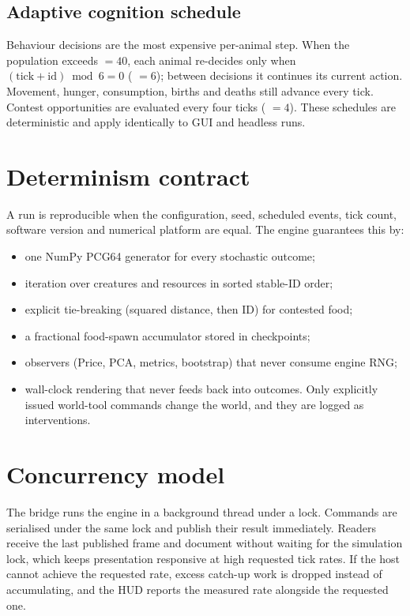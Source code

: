 \subsection{Adaptive cognition schedule}
Behaviour decisions are the most expensive per-animal step. When the population
exceeds  $=40$, each animal re-decides only
when $(\text{tick}+\text{id}) \bmod 6 = 0$ (
$=6$); between decisions it continues its current action. Movement, hunger,
consumption, births and deaths still advance every tick. Contest opportunities are
evaluated every four ticks ( $=4$). These
schedules are deterministic and apply identically to GUI and headless runs.

\section{Determinism contract}
A run is reproducible when the configuration, seed, scheduled events, tick count,
software version and numerical platform are equal. The engine guarantees this by:
\begin{itemize}[leftmargin=*]
\item one NumPy PCG64 generator for every stochastic outcome;
\item iteration over creatures and resources in sorted stable-ID order;
\item explicit tie-breaking (squared distance, then ID) for contested food;
\item a fractional food-spawn accumulator stored in checkpoints;
\item observers (Price, PCA, metrics, bootstrap) that never consume engine RNG;
\item wall-clock rendering that never feeds back into outcomes. Only explicitly
issued world-tool commands change the world, and they are logged as interventions.
\end{itemize}

\section{Concurrency model}
The bridge runs the engine in a background thread under a lock. Commands are
serialised under the same lock and publish their result immediately. Readers
receive the last published frame and document without waiting for the simulation
lock, which keeps presentation responsive at high requested tick rates. If the
host cannot achieve the requested rate, excess catch-up work is dropped instead of
accumulating, and the HUD reports the measured rate alongside the requested one.

